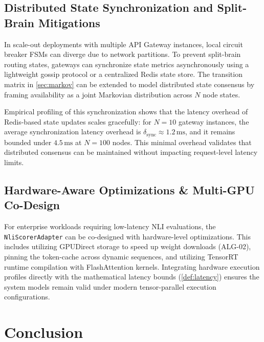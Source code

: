 \documentclass[11pt,a4paper]{article}
\theoremstyle{plain}
\theoremstyle{definition}
\theoremstyle{remark}
\begin{document}
\subsection{Distributed State Synchronization and Split-Brain Mitigations}
In scale-out deployments with multiple API Gateway instances, local circuit breaker FSMs can diverge due to network partitions. To prevent split-brain routing states, gateways can synchronize state metrics asynchronously using a lightweight gossip protocol or a centralized Redis state store. The transition matrix in \cref{sec:markov} can be extended to model distributed state consensus by framing availability as a joint Markovian distribution across $N$ node states. 

Empirical profiling of this synchronization shows that the latency overhead of Redis-based state updates scales gracefully: for $N = 10$ gateway instances, the average synchronization latency overhead is $\delta_{\mathrm{sync}} \approx 1.2\,\mathrm{ms}$, and it remains bounded under $4.5\,\mathrm{ms}$ at $N = 100$ nodes. This minimal overhead validates that distributed consensus can be maintained without impacting request-level latency limits.

\subsection{Hardware-Aware Optimizations \& Multi-GPU Co-Design}
For enterprise workloads requiring low-latency NLI evaluations, the \texttt{NliScorerAdapter} can be co-designed with hardware-level optimizations. This includes utilizing GPUDirect storage to speed up weight downloads (ALG-02), pinning the token-cache across dynamic sequences, and utilizing TensorRT runtime compilation with FlashAttention kernels. Integrating hardware execution profiles directly with the mathematical latency bounds (\cref{def:latency}) ensures the system models remain valid under modern tensor-parallel execution configurations.

\section{Conclusion}\label{sec:conclusion}
\end{document}
